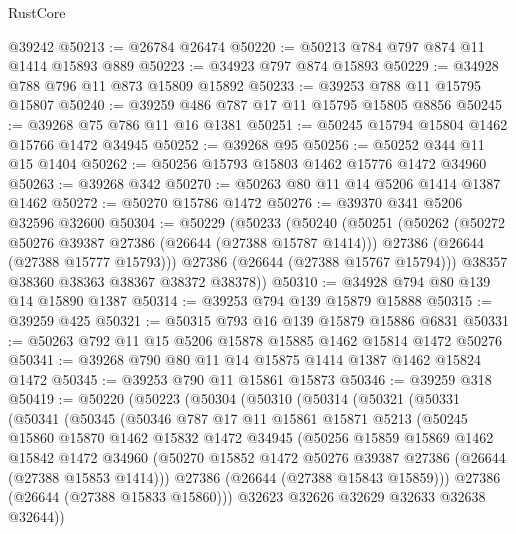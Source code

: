 \begin{lexlean}{RustCore}
\begin{coremodule}
    @39242
@50213 := @26784 @26474
@50220 := @50213 @784 @797 @874 @11 @1414 @15893 @889
@50223 := @34923 @797 @874 @15893
@50229 := @34928 @788 @796 @11 @873 @15809 @15892
@50233 := @39253 @788 @11 @15795 @15807
@50240 := @39259 @486 @787 @17 @11 @15795 @15805 @8856
@50245 := @39268 @75 @786 @11 @16 @1381
@50251 := @50245 @15794 @15804 @1462 @15766 @1472 @34945
@50252 := @39268 @95
@50256 := @50252 @344 @11 @15 @1404
@50262 := @50256 @15793 @15803 @1462 @15776 @1472 @34960
@50263 := @39268 @342
@50270 := @50263 @80 @11 @14 @5206 @1414 @1387 @1462
@50272 := @50270 @15786 @1472
@50276 := @39370 @341 @5206 @32596 @32600
@50304 := @50229
    (@50233
      (@50240
        (@50251
          (@50262
            (@50272 @50276 @39387 @27386 (@26644 (@27388 @15787 @1414)))
            @27386
            (@26644 (@27388 @15777 @15793)))
          @27386
          (@26644 (@27388 @15767 @15794)))
        @38357
        @38360
        @38363
        @38367
        @38372
        @38378))
@50310 := @34928 @794 @80 @139 @14 @15890 @1387
@50314 := @39253 @794 @139 @15879 @15888
@50315 := @39259 @425
@50321 := @50315 @793 @16 @139 @15879 @15886 @6831
@50331 := @50263 @792 @11 @15 @5206 @15878 @15885 @1462 @15814 @1472 @50276
@50341 := @39268 @790 @80 @11 @14 @15875 @1414 @1387 @1462 @15824 @1472
@50345 := @39253 @790 @11 @15861 @15873
@50346 := @39259 @318
@50419 := @50220
    (@50223
      (@50304
        (@50310
          (@50314
            (@50321
              (@50331
                (@50341
                  (@50345
                    (@50346
                      @787
                      @17
                      @11
                      @15861
                      @15871
                      @5213
                      (@50245
                        @15860
                        @15870
                        @1462
                        @15832
                        @1472
                        @34945
                        (@50256
                          @15859
                          @15869
                          @1462
                          @15842
                          @1472
                          @34960
                          (@50270 @15852 @1472 @50276 @39387 @27386 (@26644 (@27388 @15853 @1414)))
                          @27386
                          (@26644 (@27388 @15843 @15859)))
                        @27386
                        (@26644 (@27388 @15833 @15860)))
                      @32623
                      @32626
                      @32629
                      @32633
                      @32638
                      @32644))

\end{coremodule}
\end{lexlean}
